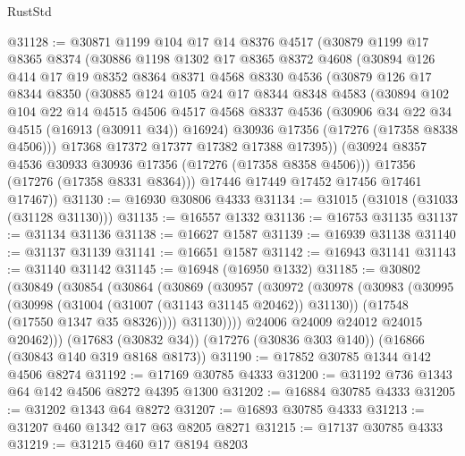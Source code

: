 \begin{lexlean}{RustStd}
\begin{coremodule}
@31128 := @30871
    @1199
    @104
    @17
    @14
    @8376
    @4517
    (@30879
      @1199
      @17
      @8365
      @8374
      (@30886
        @1198
        @1302
        @17
        @8365
        @8372
        @4608
        (@30894
          @126
          @414
          @17
          @19
          @8352
          @8364
          @8371
          @4568
          @8330
          @4536
          (@30879
            @126
            @17
            @8344
            @8350
            (@30885
              @124
              @105
              @24
              @17
              @8344
              @8348
              @4583
              (@30894
                @102
                @104
                @22
                @14
                @4515
                @4506
                @4517
                @4568
                @8337
                @4536
                (@30906 @34 @22 @34 @4515 (@16913 (@30911 @34)) @16924)
                @30936
                @17356
                (@17276 (@17358 @8338 @4506)))
              @17368
              @17372
              @17377
              @17382
              @17388
              @17395))
          (@30924 @8357 @4536 @30933 @30936 @17356 (@17276 (@17358 @8358 @4506)))
          @17356
          (@17276 (@17358 @8331 @8364)))
        @17446
        @17449
        @17452
        @17456
        @17461
        @17467))
@31130 := @16930 @30806 @4333
@31134 := @31015 (@31018 (@31033 (@31128 @31130)))
@31135 := @16557 @1332
@31136 := @16753 @31135
@31137 := @31134 @31136
@31138 := @16627 @1587
@31139 := @16939 @31138
@31140 := @31137 @31139
@31141 := @16651 @1587
@31142 := @16943 @31141
@31143 := @31140 @31142
@31145 := @16948 (@16950 @1332)
@31185 := @30802
    (@30849
      (@30854
        (@30864
          (@30869
            (@30957
              (@30972
                (@30978
                  (@30983
                    (@30995
                      (@30998 (@31004 (@31007 (@31143 @31145 @20462)) @31130))
                      (@17548 (@17550 @1347 @35 @8326))))
                  @31130))))
          @24006
          @24009
          @24012
          @24015
          @20462)))
    (@17683 (@30832 @34))
    (@17276 (@30836 @303 @140))
    (@16866 (@30843 @140 @319 @8168 @8173))
@31190 := @17852 @30785 @1344 @142 @4506 @8274
@31192 := @17169 @30785 @4333
@31200 := @31192 @736 @1343 @64 @142 @4506 @8272 @4395 @1300
@31202 := @16884 @30785 @4333
@31205 := @31202 @1343 @64 @8272
@31207 := @16893 @30785 @4333
@31213 := @31207 @460 @1342 @17 @63 @8205 @8271
@31215 := @17137 @30785 @4333
@31219 := @31215 @460 @17 @8194 @8203

\end{coremodule}
\end{lexlean}
